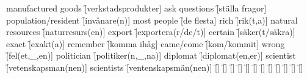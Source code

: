 \begin{questions}
\begin{multicols}{2}
        \question manufactured goods \f[verkstadsprodukter]
        \question ask questions \f[ställa fragor]
        \question population/resident \f[invånare(n)]
        \question most people \f[de flesta]
        \question rich \f[rik(t,a)]
        \question natural resources \f[naturresurs(en)]
        \question export \f[exportera(r/de/t)]
        \question certain \f[säker(t/säkra)]
        \question exact \f[exakt(a)]
        \question remember \f[komma ihåg]
        \question came/come \f[kom/kommit]
        \question wrong \f[fel(et,\_,en)]
        \question politician \f[politiker(n,\_,na)]
        \question diplomat \f[diplomat(en,er)]
        \question scientist \f[vetenskapsman(nen)]
        \question scientists \f[ventenskapsmän(nen)]
        \question  \f[]
        \question  \f[]
        \question  \f[]
        \question  \f[]
        \question  \f[]
        \question  \f[]
        \question  \f[]
        \question  \f[]
        \question  \f[]
        \question  \f[]
        \question  \f[]
        \question  \f[]
    \end{multicols}
\end{questions}
